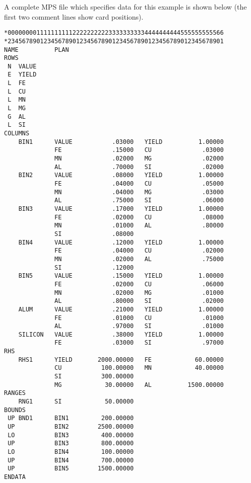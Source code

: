 \def\arraystretch{1}

A complete MPS file which specifies data for this example is shown
below (the first two comment lines show card positions).

\newpage

\begin{footnotesize}
\begin{verbatim}
*000000001111111111222222222233333333334444444444555555555566
*234567890123456789012345678901234567890123456789012345678901
NAME          PLAN
ROWS
 N  VALUE
 E  YIELD
 L  FE
 L  CU
 L  MN
 L  MG
 G  AL
 L  SI
COLUMNS
    BIN1      VALUE           .03000   YIELD          1.00000
              FE              .15000   CU              .03000
              MN              .02000   MG              .02000
              AL              .70000   SI              .02000
    BIN2      VALUE           .08000   YIELD          1.00000
              FE              .04000   CU              .05000
              MN              .04000   MG              .03000
              AL              .75000   SI              .06000
    BIN3      VALUE           .17000   YIELD          1.00000
              FE              .02000   CU              .08000
              MN              .01000   AL              .80000
              SI              .08000
    BIN4      VALUE           .12000   YIELD          1.00000
              FE              .04000   CU              .02000
              MN              .02000   AL              .75000
              SI              .12000
    BIN5      VALUE           .15000   YIELD          1.00000
              FE              .02000   CU              .06000
              MN              .02000   MG              .01000
              AL              .80000   SI              .02000
    ALUM      VALUE           .21000   YIELD          1.00000
              FE              .01000   CU              .01000
              AL              .97000   SI              .01000
    SILICON   VALUE           .38000   YIELD          1.00000
              FE              .03000   SI              .97000
RHS
    RHS1      YIELD       2000.00000   FE            60.00000
              CU           100.00000   MN            40.00000
              SI           300.00000
              MG            30.00000   AL          1500.00000
RANGES
    RNG1      SI            50.00000
BOUNDS
 UP BND1      BIN1         200.00000
 UP           BIN2        2500.00000
 LO           BIN3         400.00000
 UP           BIN3         800.00000
 LO           BIN4         100.00000
 UP           BIN4         700.00000
 UP           BIN5        1500.00000
ENDATA
\end{verbatim}
\end{footnotesize}

